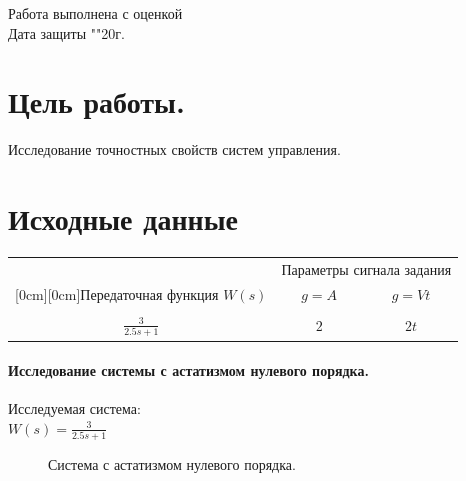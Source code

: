 \documentclass[a4paper, 11pt]{article}
\begin{document}
\begin{titlepage}
		Работа выполнена с оценкой \hspace{0.5cm} \underline{\hspace{10cm}} \\ 
		\vspace{1cm}
		Дата защиты "\underline{\hspace{0.4cm}}"\hspace{0.1cm}\underline{\hspace{1.5cm}}\hspace{0.1cm}20\underline{\hspace{0.4cm}}г.
		
	\end{titlepage}
\section*{Цель работы.}Исследование точностных свойств систем управления.

\section*{Исходные данные}

\begin{tabular}{ccc}
	& \multicolumn{2}{c}{Параметры сигнала задания} \\
	\raisebox{1.5ex}[0cm][0cm]{Передаточная функция $W(s)$}
	& $g = A$ & $g = Vt$ \\
	\hline\\
	$\frac{3} {2.5s+1}$ & $2$ & $2t$ \\
\end{tabular}

\paragraph{Исследование системы с астатизмом нулевого порядка.}Исследуемая система:\\
\large{$W(s)= \frac{3} {2.5s+1}$}

\begin{figure}[h]
    \caption{Система с астатизмом нулевого порядка.}
    \label{one}
\end{figure}
\end{document}
